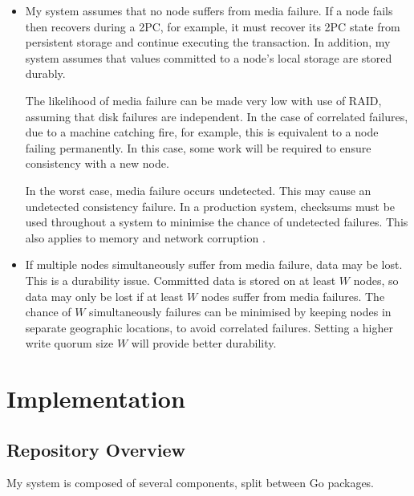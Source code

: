 \documentclass[12pt,a4paper,twoside,openany]{report}
\begin{document}
\begin{itemize}
\item
My system assumes that no node suffers from media failure. If a node fails then recovers during a 2PC, for example, it must recover its 2PC state from persistent storage and continue executing the transaction. In addition, my system assumes that values committed to a node's local storage are stored durably.

The likelihood of media failure can be made very low with use of RAID, assuming that disk failures are independent. %
In the case of correlated failures, due to a machine catching fire, for example, this is equivalent to a node failing permanently. In this case, some work will be required to ensure consistency with a new node.

In the worst case, media failure occurs undetected. This may cause an undetected consistency failure. In a production system, checksums must be used throughout a system to minimise the chance of undetected failures. This also applies to memory and network corruption \cite{chang2008bigtable}.

\item
If multiple nodes simultaneously suffer from media failure, data may be lost. This is a durability issue. Committed data is stored on at least $W$ nodes, so data may only be lost if at least $W$ nodes suffer from media failures. The chance of $W$ simultaneously failures can be minimised by keeping nodes in separate geographic locations, to avoid correlated failures. Setting a higher write quorum size $W$ will provide better durability.

\end{itemize}

\chapter{Implementation}


\section{Repository Overview}

My system is composed of several components, split between Go packages.
\end{document}
